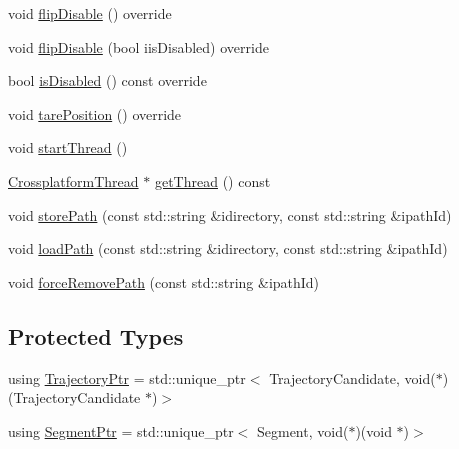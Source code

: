 \begin{DoxyCompactItemize}
\item 
void \mbox{\hyperlink{classokapi_1_1AsyncMotionProfileController_a7069b2b7373aec21c84369392d8d34d8}{flip\+Disable}} () override
\item 
void \mbox{\hyperlink{classokapi_1_1AsyncMotionProfileController_a3dc30b14b36f1fc1fc61c9c45ced002e}{flip\+Disable}} (bool iis\+Disabled) override
\item 
bool \mbox{\hyperlink{classokapi_1_1AsyncMotionProfileController_a04bc0f7be2c116163bfbef0571dec2ef}{is\+Disabled}} () const override
\item 
void \mbox{\hyperlink{classokapi_1_1AsyncMotionProfileController_afc3476c87e3428f9f166273688e45249}{tare\+Position}} () override
\item 
void \mbox{\hyperlink{classokapi_1_1AsyncMotionProfileController_af54f59d0269d84b12eb148271e349646}{start\+Thread}} ()
\item 
\mbox{\hyperlink{classCrossplatformThread}{Crossplatform\+Thread}} $\ast$ \mbox{\hyperlink{classokapi_1_1AsyncMotionProfileController_aaac5113b3567c28dc1c5ba0dcf7facdd}{get\+Thread}} () const
\item 
void \mbox{\hyperlink{classokapi_1_1AsyncMotionProfileController_ad588aa51d62169159ff5e4b05ad3982c}{store\+Path}} (const std\+::string \&idirectory, const std\+::string \&ipath\+Id)
\item 
void \mbox{\hyperlink{classokapi_1_1AsyncMotionProfileController_a87c74350a819a3a322321be787c32d1f}{load\+Path}} (const std\+::string \&idirectory, const std\+::string \&ipath\+Id)
\item 
void \mbox{\hyperlink{classokapi_1_1AsyncMotionProfileController_ace5f9053d3455e6f5e69c63f1196521e}{force\+Remove\+Path}} (const std\+::string \&ipath\+Id)
\end{DoxyCompactItemize}
\subsection*{Protected Types}
\begin{DoxyCompactItemize}
\item 
using \mbox{\hyperlink{classokapi_1_1AsyncMotionProfileController_acf9be87bd2dd90aec23d91f0474f2d35}{Trajectory\+Ptr}} = std\+::unique\+\_\+ptr$<$ Trajectory\+Candidate, void($\ast$)(Trajectory\+Candidate $\ast$)$>$
\item 
using \mbox{\hyperlink{classokapi_1_1AsyncMotionProfileController_a3ed298e703263af478d65e862afca6f3}{Segment\+Ptr}} = std\+::unique\+\_\+ptr$<$ Segment, void($\ast$)(void $\ast$)$>$
\end{DoxyCompactItemize}
